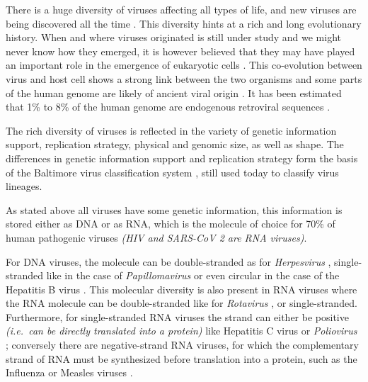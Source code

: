 \documentclass[
  11pt,
  twoside,
  BCOR=10mm,
  listof=totoc]{scrbook}
\begin{document}
There is a huge diversity of viruses affecting all types of life, and new viruses are being discovered all the time \autocite{edgarPetabasescaleSequenceAlignment2022}. This diversity hints at a rich and long evolutionary history. When and where viruses originated is still under study \autocite{nasirInvestigatingConceptOrigin2020,forterreOriginViruses2009} and we might never know how they emerged, it is however believed that they may have played an important role in the emergence of eukaryotic cells \autocite{forterreOriginVirusesTheir2006}. This co-evolution between virus and host cell shows a strong link between the two organisms and some parts of the human genome are likely of ancient viral origin \autocite{boekeRetrotransposonsEndogenousRetroviruses1997,kojimaViruslikeInsertionsSequence2021}. It has been estimated that 1\% to 8\% of the human genome are endogenous retroviral sequences \autocite{lowerVirusesAllUs1996,griffithsEndogenousRetrovirusesHuman2001}.

The rich diversity of viruses is reflected in the variety of genetic information support, replication strategy, physical and genomic size, as well as shape. The differences in genetic information support and replication strategy form the basis of the Baltimore virus classification system \autocite{baltimoreExpressionAnimalVirus1971} , still used today \autocite{kooninBaltimoreClassificationViruses2021} to classify virus lineages.

As stated above all viruses have some genetic information, this information is stored either as DNA or as RNA, which is the molecule of choice for 70\% of human pathogenic viruses \autocite{domingoRNAVirusGenomes2018} \emph{(HIV and SARS-CoV 2 are RNA viruses)}.

For DNA viruses, the molecule can be double-stranded as for \emph{Herpesvirus} \autocite{mcgeochTopicsHerpesvirusGenomics2006,boehmerHerpesVirusReplication2003}, single-stranded like in the case of \emph{Papillomavirus} \autocite{brentjensHumanPapillomavirusReview2002} or even circular in the case of the Hepatitis B virus \autocite{kayHepatitisVirusGenetic2007}. This molecular diversity is also present in RNA viruses where the RNA molecule can be double-stranded like for \emph{Rotavirus} \autocite{parasharRotavirus1998}, or single-stranded. Furthermore, for single-stranded RNA viruses the strand can either be positive \emph{(i.e.~can be directly translated into a protein)} like Hepatitis C virus \autocite{simmondsVariabilityHepatitisVirus1995} or \emph{Poliovirus} \autocite{wimmerGeneticsPoliovirus1993,racanielloOneHundredYears2006}; conversely there are negative-strand RNA viruses, for which the complementary strand of RNA must be synthesized before translation into a protein, such as the Influenza or Measles viruses \autocite{paleseNegativestrandRNAViruses1996}.
\end{document}

